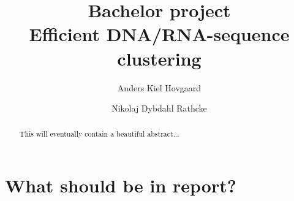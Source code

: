 \documentclass[11pt,a4paper]{article}
\title{Bachelor project \\
       \vspace{2mm}
       {\LARGE Efficient DNA/RNA-sequence clustering}}
\author{Anders Kiel Hovgaard \and Nikolaj Dybdahl Rathcke}
\begin{document}
\maketitle
\thispagestyle{empty}
\newpage

\begin{abstract}
  This will eventually contain a beautiful abstract...
\end{abstract}
\thispagestyle{plain}
\newpage

\tableofcontents
\thispagestyle{plain}
\newpage

\thispagestyle{fancy}
\section{What should be in report?}
\end{document}
